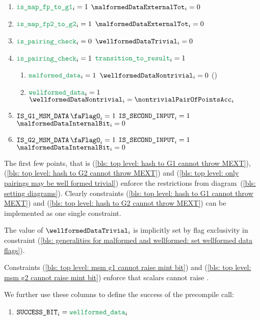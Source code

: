 \begin{enumerate}[resume]
    \item
        \label{bls: top level: hash to G1 cannot throw MEXT}
        \If $\locIsBlsMapFpToGOne    _{i} = 1$ \Then $\malformedDataExternalTot _{i} = 0$
    \item
        \label{bls: top level: hash to G2 cannot throw MEXT}
        \If $\locIsBlsMapFpTwoToGTwo _{i} = 1$ \Then $\malformedDataExternalTot _{i} = 0$
    \item
        \label{bls: top level: only pairings may be well formed trivial}
        \If $\locIsBlsPairingCheck _{i} = 0$ \Then $\wellformedDataTrivial _{i} = 0$
    \item
        \If $\locIsBlsPairingCheck _{i} = 1$ \et   $\locTransitionToResult _{i} = 1$
        \begin{enumerate}
            \item
                \If $\locMalformedData _{i} = 1$ \Then $\wellformedDataNontrivial _{i} = 0$ \quad (\sanityCheck)
            \item
                \label{bls: generalities for malformed and wellformed: set wellformed data flags}
                \If $\locWellformedData _{i} = 1$ \Then $\wellformedDataNontrivial _{i} = \nontrivialPairOfPointsAcc _{i}$
        \end{enumerate}
    \item 
        \label{bls: top level: msm g1 cannot raise mint bit}  
        \If $\isBlsGOneMsmData _{i} = 1$ \et $\texttt{IS\_SECOND\_INPUT} _{i} = 1$ \Then $\malformedDataInternalBit _{i} = 0$
    \item 
        \label{bls: top level: msm g2 cannot raise mint bit}
        \If $\isBlsGTwoMsmData _{i} = 1$ \et $\texttt{IS\_SECOND\_INPUT} _{i} = 1$ \Then $\malformedDataInternalBit _{i} = 0$
\end{enumerate}
\saNote{}
The first few points, that is
(\ref{bls: top level: hash to G1 cannot throw MEXT}),
(\ref{bls: top level: hash to G2 cannot throw MEXT}) and
(\ref{bls: top level: only pairings may be well formed trivial})
enforce the restrictions from
diagram~(\ref{bls: setting diagrams}).
Clearly constraints
(\ref{bls: top level: hash to G1 cannot throw MEXT}) and
(\ref{bls: top level: hash to G2 cannot throw MEXT})
can be implemented as one single constraint.

\saNote{}
The value of $\wellformedDataTrivial_{i}$ is implicitly set by flag exclusivity in constraint (\ref{bls: generalities for malformed and wellformed: set wellformed data flags}).

\saNote{}
Constraints
(\ref{bls: top level: msm g1 cannot raise mint bit}) and
(\ref{bls: top level: msm g2 cannot raise mint bit})
enforce that scalars cannot raise \malformedDataInternalBit{}.

\noindent We further use these columns to define the success of the precompile call:
\begin{enumerate}[resume]
    \item $\blsSuccessBit  _{i} = \locWellformedData _{i}$
\end{enumerate}

